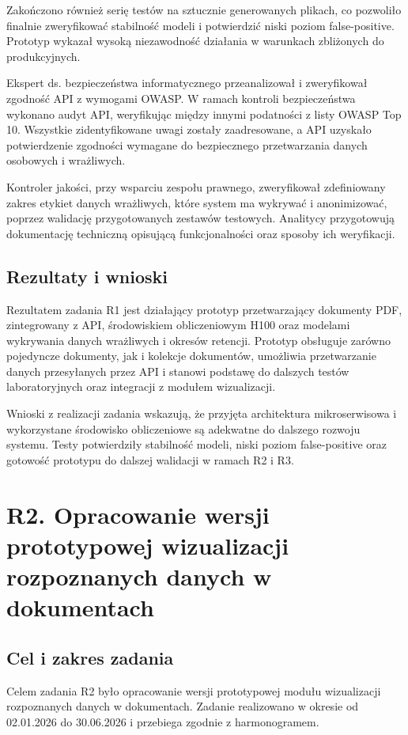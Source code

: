 \documentclass[12pt,a4paper]{report}
\begin{document}
Zakończono również serię testów na sztucznie generowanych plikach, co pozwoliło finalnie zweryfikować stabilność modeli i potwierdzić niski poziom false-positive. Prototyp wykazał wysoką niezawodność działania w warunkach zbliżonych do produkcyjnych.

Ekspert ds. bezpieczeństwa informatycznego przeanalizował i zweryfikował zgodność API z wymogami OWASP. W ramach kontroli bezpieczeństwa wykonano audyt API, weryfikując między innymi podatności z listy OWASP Top 10. Wszystkie zidentyfikowane uwagi zostały zaadresowane, a API uzyskało potwierdzenie zgodności wymagane do bezpiecznego przetwarzania danych osobowych i wrażliwych.

Kontroler jakości, przy wsparciu zespołu prawnego, zweryfikował zdefiniowany zakres etykiet danych wrażliwych, które system ma wykrywać i anonimizować, poprzez walidację przygotowanych zestawów testowych. Analitycy przygotowują dokumentację techniczną opisującą funkcjonalności oraz sposoby ich weryfikacji.

\subsection{Rezultaty i wnioski}
Rezultatem zadania R1 jest działający prototyp przetwarzający dokumenty PDF, zintegrowany z API, środowiskiem obliczeniowym H100 oraz modelami wykrywania danych wrażliwych i okresów retencji. Prototyp obsługuje zarówno pojedyncze dokumenty, jak i kolekcje dokumentów, umożliwia przetwarzanie danych przesyłanych przez API i stanowi podstawę do dalszych testów laboratoryjnych oraz integracji z modułem wizualizacji.

Wnioski z realizacji zadania wskazują, że przyjęta architektura mikroserwisowa i wykorzystane środowisko obliczeniowe są adekwatne do dalszego rozwoju systemu. Testy potwierdziły stabilność modeli, niski poziom false-positive oraz gotowość prototypu do dalszej walidacji w ramach R2 i R3.

\section{R2. Opracowanie wersji prototypowej wizualizacji rozpoznanych danych w dokumentach}
\subsection{Cel i zakres zadania}
Celem zadania R2 było opracowanie wersji prototypowej modułu wizualizacji rozpoznanych danych w dokumentach. Zadanie realizowano w okresie od 02.01.2026 do 30.06.2026 i przebiega zgodnie z harmonogramem.
\end{document}
